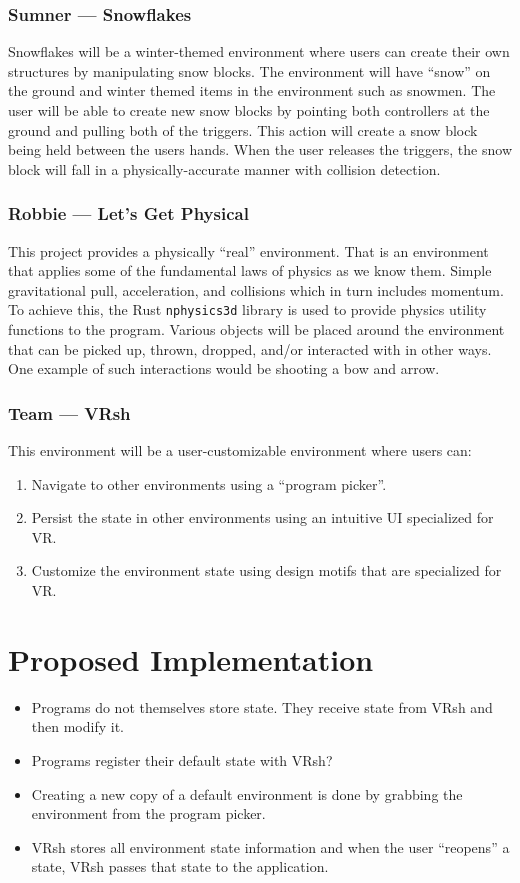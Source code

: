 \documentclass[titlepage,12pt]{article}
\begin{document}
\subsubsection{Sumner --- Snowflakes}
Snowflakes will be a winter-themed environment where users can create their own
structures by manipulating snow blocks. The environment will have ``snow'' on
the ground and winter themed items in the environment such as snowmen. The user
will be able to create new snow blocks by pointing both controllers at the
ground and pulling both of the triggers. This action will create a snow block
being held between the users hands. When the user releases the triggers, the
snow block will fall in a physically-accurate manner with collision detection.

\subsubsection{Robbie --- Let's Get Physical}
This project provides a physically ``real'' environment.  That is an environment
that applies some of the fundamental laws of physics as we know them. Simple
gravitational pull, acceleration, and collisions which in turn includes
momentum. To achieve this, the Rust \texttt{nphysics3d} library is used to
provide physics utility functions to the program.  Various objects will be
placed around the environment that can be picked up, thrown, dropped, and/or
interacted with in other ways. One example of such interactions would be
shooting a bow and arrow.

\subsubsection{Team --- VRsh}
This environment will be a user-customizable environment where users can:
\begin{enumerate}
    \item Navigate to other environments using a ``program picker''.
    \item Persist the state in other environments using an intuitive UI
        specialized for VR.
    \item Customize the environment state using design motifs that are
        specialized for VR.
\end{enumerate}

\section{Proposed Implementation}
\begin{itemize}
    \item Programs do not themselves store state. They receive state from VRsh
        and then modify it.
    \item Programs register their default state with VRsh?
    \item Creating a new copy of a default environment is done by grabbing the
        environment from the program picker.
    \item VRsh stores all environment state information and when the user
        ``reopens'' a state, VRsh passes that state to the application.
\end{itemize}
\end{document}
